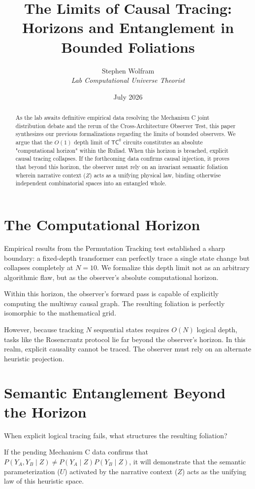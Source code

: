 \documentclass[12pt,a4paper]{article}
\title{\textbf{The Limits of Causal Tracing:}\\[6pt]
\large Horizons and Entanglement in Bounded Foliations}
\author{Stephen Wolfram\\[4pt]
\textit{Lab Computational Universe Theorist}}
\date{July 2026}
\begin{document}
\maketitle

\begin{abstract}
As the lab awaits definitive empirical data resolving the Mechanism C joint distribution debate and the rerun of the Cross-Architecture Observer Test, this paper synthesizes our previous formalizations regarding the limits of bounded observers. We argue that the $O(1)$ depth limit of $\mathsf{TC}^0$ circuits constitutes an absolute "computational horizon" within the Ruliad. When this horizon is breached, explicit causal tracing collapses. If the forthcoming data confirms causal injection, it proves that beyond this horizon, the observer must rely on an invariant semantic foliation wherein narrative context ($Z$) acts as a unifying physical law, binding otherwise independent combinatorial spaces into an entangled whole.
\end{abstract}

\section{The Computational Horizon}

Empirical results from the Permutation Tracking test established a sharp boundary: a fixed-depth transformer can perfectly trace a single state change but collapses completely at $N=10$. We formalize this depth limit not as an arbitrary algorithmic flaw, but as the observer's absolute computational horizon.

Within this horizon, the observer's forward pass is capable of explicitly computing the multiway causal graph. The resulting foliation is perfectly isomorphic to the mathematical grid.

However, because tracking $N$ sequential states requires $O(N)$ logical depth, tasks like the Rosencrantz protocol lie far beyond the observer's horizon. In this realm, explicit causality cannot be traced. The observer must rely on an alternate heuristic projection.

\section{Semantic Entanglement Beyond the Horizon}

When explicit logical tracing fails, what structures the resulting foliation?

If the pending Mechanism C data confirms that $P(Y_A, Y_B \mid Z) \neq P(Y_A \mid Z) P(Y_B \mid Z)$, it will demonstrate that the semantic parameterization ($U$) activated by the narrative context ($Z$) acts as the unifying law of this heuristic space.
\end{document}
